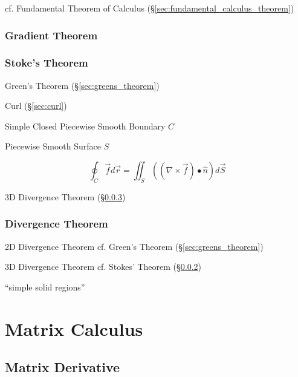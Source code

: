 cf. Fundamental Theorem of Calculus (\S\ref{sec:fundamental_calculus_theorem})



\subsubsection{Gradient Theorem}\label{sec:gradient_theorem}

\subsubsection{Stoke's Theorem}\label{sec:stokes_theorem}

\fist Green's Theorem (\S\ref{sec:greens_theorem})

Curl (\S\ref{sec:curl})

Simple Closed Piecewise Smooth Boundary $C$

Piecewise Smooth Surface $S$

\[
  \oint_C \vec{f} d\vec{r}
    = \iint_S ((\nabla \times \vec{f}) \bullet \hat{n}) d\vec{S}
\]

\fist 3D Divergence Theorem (\S\ref{sec:divergence_theorem})



\subsubsection{Divergence Theorem}\label{sec:divergence_theorem}

2D Divergence Theorem \fist cf. Green's Theorem (\S\ref{sec:greens_theorem})

3D Divergence Theorem \fist cf. Stokes' Theorem (\S\ref{sec:stokes_theorem})

``simple solid regions''



\section{Matrix Calculus}\label{sec:matrix_calculus}

\subsection{Matrix Derivative}\label{sec:matrix_derivative}

